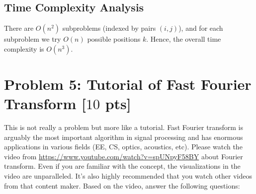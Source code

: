 \documentclass[letterpaper, 11pt]{article}
\newcommand{\1}{\mathds{1}}	%
\theoremstyle{definition}
\newcommand{\problem}[1]{\section*{Problem #1}}
\newenvironment{solution}{{\par\noindent\it Solution.}}{}
\begin{document}
\begin{solution}
    \subsection*{Time Complexity Analysis}
    There are \(O(n^2)\) subproblems (indexed by pairs \((i,j)\)), and for each subproblem we try \(O(n)\) possible positions \(k\). Hence, the overall time complexity is \(O(n^3)\).
    
\end{solution}
\newpage

\problem{5: Tutorial of Fast Fourier Transform [$10$ pts]}
This is not really a problem but more like a tutorial. Fast Fourier transform is arguably the most important algorithm in signal processing and has enormous applications in various fields (EE, CS, optics, acoustics, etc). Please watch the video from \url{https://www.youtube.com/watch?v=spUNpyF58BY} about Fourier transform. Even if you are familiar with the concept, the visualizations in the video are unparalleled. It's also highly recommended that you watch other videos from that content maker. Based on the video, answer the following questions:
\end{document}
